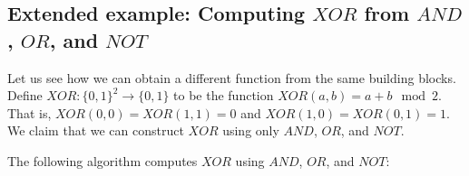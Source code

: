 \subsection{Extended example: Computing \(\ensuremath{\mathit{XOR}}\)
from \(\ensuremath{\mathit{AND}}\), \(\ensuremath{\mathit{OR}}\), and
\(\ensuremath{\mathit{NOT}}\)}\label{xoraonexample}

Let us see how we can obtain a different function from the same building
blocks. Define
\(\ensuremath{\mathit{XOR}}:\{0,1\}^2 \rightarrow \{0,1\}\) to be the
function \(\ensuremath{\mathit{XOR}}(a,b)= a + b \mod 2\). That is,
\(\ensuremath{\mathit{XOR}}(0,0)=\ensuremath{\mathit{XOR}}(1,1)=0\) and
\(\ensuremath{\mathit{XOR}}(1,0)=\ensuremath{\mathit{XOR}}(0,1)=1\). We
claim that we can construct \(\ensuremath{\mathit{XOR}}\) using only
\(\ensuremath{\mathit{AND}}\), \(\ensuremath{\mathit{OR}}\), and
\(\ensuremath{\mathit{NOT}}\).


The following algorithm computes \(\ensuremath{\mathit{XOR}}\) using
\(\ensuremath{\mathit{AND}}\), \(\ensuremath{\mathit{OR}}\), and
\(\ensuremath{\mathit{NOT}}\):


\hypertarget{alganalaysis}{}

